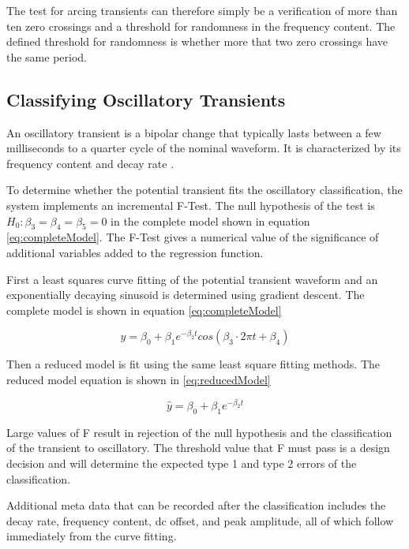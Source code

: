 \documentclass[10pt,conference,compsocconf]{IEEEtran}
\begin{document}
The test for arcing transients can therefore simply be a verification of more than ten zero crossings and a threshold for randomness in the frequency content. The defined threshold for randomness is whether more that two zero crossings have the same period.

\subsection{Classifying Oscillatory Transients}

An oscillatory transient is a bipolar change that typically lasts between a few milliseconds to a quarter cycle of the nominal waveform. It is characterized by its frequency content and decay rate \cite{IEEE:2018:1159D3}. 

To determine whether the potential transient fits the oscillatory classification, the system implements an incremental F-Test. The null hypothesis of the test is  $H_0: \beta_3 = \beta_4 = \beta_5 = 0$ in the complete model shown in equation \ref{eq:completeModel}. The F-Test gives a numerical value of the significance of additional variables added to the regression function. 

First a least squares curve fitting of the potential transient waveform and an exponentially decaying sinusoid is determined using gradient descent. The complete model is shown in equation \ref{eq:completeModel}

\begin{equation}
\label{eq:completeModel}
\hat{y} = \beta_0 + \beta_1 e^{-\beta_2 t} cos(\beta_3 \cdot 2 \pi t + \beta_4)
\end{equation}

Then a reduced model is fit using the same least square fitting methods. The reduced model equation is shown in \ref{eq:reducedModel}

\begin{equation}
\label{eq:reducedModel}
\hat{y} = \beta_0 + \beta_1 e^{-\beta_2 t}
\end{equation}

Large values of F result in rejection of the null hypothesis and the classification of the transient to oscillatory. The threshold value that F must pass is a design decision and will determine the expected type 1 and type 2 errors of the classification. 

Additional meta data that can be recorded after the classification includes the decay rate, frequency content, dc offset, and peak amplitude, all of which follow immediately from the curve fitting. 
\end{document}

